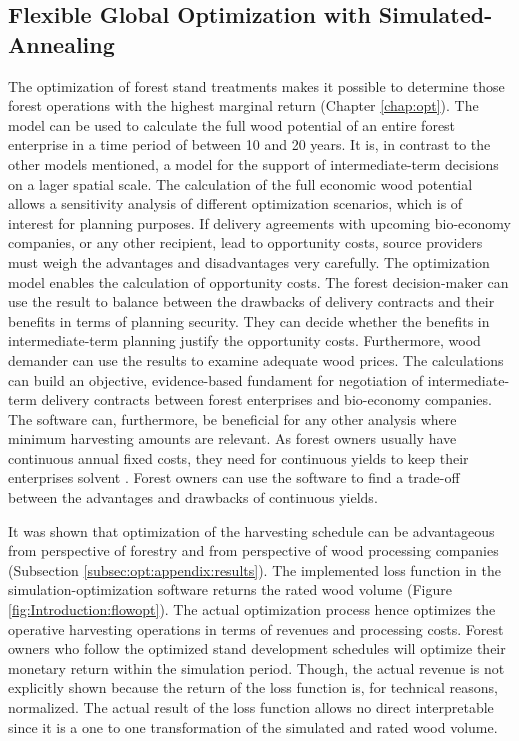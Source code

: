 \subsection{Flexible Global Optimization with Simulated-Annealing}
\label{subsec:discussion:struct:opt}
The optimization of forest stand treatments makes it possible to determine those forest operations with the highest marginal return (Chapter \ref{chap:opt}). The model can be used to calculate the full wood potential of an entire forest enterprise in a time period of between 10 and 20 years. It is, in contrast to the other models mentioned, a model for the support of intermediate-term decisions on a lager spatial scale. The calculation of the full economic wood potential allows a sensitivity analysis of different optimization scenarios, which is of interest for planning purposes. If delivery agreements with upcoming bio-economy companies, or any other recipient, lead to opportunity costs, source providers must weigh the advantages and disadvantages very carefully. The optimization model enables the calculation of opportunity costs. The forest decision-maker can use the result to balance between the drawbacks of delivery contracts and their benefits in terms of planning security. They can decide whether the benefits in intermediate-term planning justify the opportunity costs. Furthermore, wood demander can use the results to examine adequate wood prices. The calculations can build an objective, evidence-based fundament for negotiation of intermediate-term delivery contracts between forest enterprises and bio-economy companies. The software can, furthermore, be beneficial for any other analysis where minimum harvesting amounts are relevant. As forest owners usually have continuous annual fixed costs, they need for continuous yields to keep their enterprises solvent \citep[p. 74]{mohring_2010b}. Forest owners can use the software to find a trade-off between the advantages and drawbacks of continuous yields.

It was shown that optimization of the harvesting schedule can be advantageous from perspective of forestry and from perspective of wood processing companies (Subsection \ref{subsec:opt:appendix:results}). The implemented loss function in the simulation-optimization software returns the rated wood volume (Figure \ref{fig:Introduction:flowopt}). The actual optimization process hence optimizes the operative harvesting operations in terms of revenues and processing costs. Forest owners who follow the optimized stand development schedules will optimize their monetary return within the simulation period. Though, the actual revenue is not explicitly shown because the return of the loss function is, for technical reasons, normalized. The actual result of the loss function allows no direct interpretable since it is a one to one transformation of the simulated and rated wood volume.

